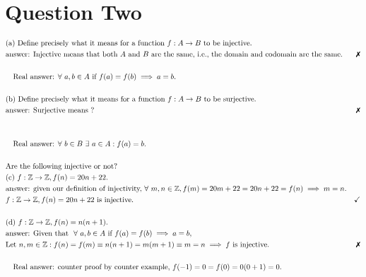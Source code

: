 \documentclass{article}
\begin{document}
    \section{Question Two}
        \begin{align*}
            &\text{(a) Define precisely what it means for a function }f:A\rightarrow B\text{ to be injective}.\\
            &\text{answer: Injective means that both }A\text{ and }B \text{ are the same, i.e., the domain and codomain are the same}.&\xmark\\
            &\\
            &\quad\text{Real answer: }\forall~ a,b\in A\text{ if }f(a) = f(b) \implies a = b.\\
            &\\
            &\text{(b) Define precisely what it means for a function }f:A\rightarrow B\text{ to be surjective}.\\
            &\text{answer: Surjective means ?}&\xmark\\
            &\\
            &\\
            &\quad\text{Real answer: }\forall~ b\in B ~\exists~a\in A : f(a) = b.\\
            &\\
            &\text{Are the following injective or not?}\\
            &\text{(c) }f:\mathbb{Z}\rightarrow\mathbb{Z}, f(n) = 20n + 22.\\
            &\text{answer: given our definition of injectivity, }\forall~ m,n\in \mathbb{Z}, f(m) = 20m+22 = 20n + 22 = f(n) \implies m = n.\\
            &f:\mathbb{Z}\rightarrow\mathbb{Z}, f(n) = 20n + 22 \text{ is injective.} & \checkmark\\
            &\\
            &\text{(d) }f:\Z\rightarrow\Z, f(n) = n(n+1).\\
            &\text{answer: Given that }\all a,b\in A\text{ if }f(a) = f(b) \implies a = b,\\
            &\text{Let }n, m\in \Z : f(n) = f(m) \equiv n(n+1) = m(m+1) \equiv m = n \implies f\text{ is injective}.&\xmark\\
            &\\
            &\quad\text{Real answer: counter proof by counter example, }f(-1) = 0 = f(0) = 0(0 + 1) = 0.\\
            &\\

\end{align*}
\end{document}
